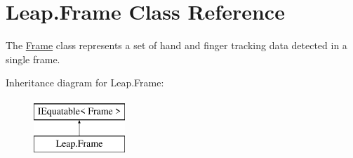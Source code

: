 \hypertarget{class_leap_1_1_frame}{}\section{Leap.\+Frame Class Reference}
\label{class_leap_1_1_frame}


The \mbox{\hyperlink{class_leap_1_1_frame}{Frame}} class represents a set of hand and finger tracking data detected in a single frame.  


Inheritance diagram for Leap.\+Frame\+:\begin{figure}[H]
\begin{center}
\leavevmode
\includegraphics[height=2.000000cm]{class_leap_1_1_frame}
\end{center}
\end{figure}
